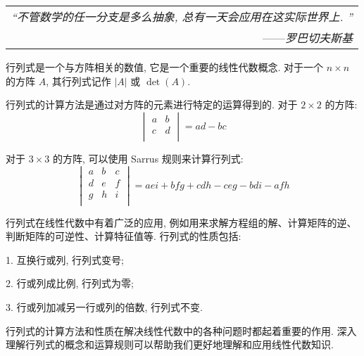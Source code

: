 \begin{flushright}
    \begin{tabular}{r||}
        \textit{“不管数学的任一分支是多么抽象, 总有一天会应用在这实际世界上. ”}\\
        ——\textit{罗巴切夫斯基}
    \end{tabular}
\end{flushright}

行列式是一个与方阵相关的数值, 它是一个重要的线性代数概念. 对于一个 $n \times n$ 的方阵 $A$, 其行列式记作 $|A|$ 或 $\det(A)$. 

行列式的计算方法是通过对方阵的元素进行特定的运算得到的. 对于 $2 \times 2$ 的方阵: 
$$
\begin{vmatrix}
a & b \\
c & d \\
\end{vmatrix} = ad - bc
$$

对于 $3 \times 3$ 的方阵, 可以使用 Sarrus 规则来计算行列式: 
$$
\begin{vmatrix}
a & b & c \\
d & e & f \\
g & h & i \\
\end{vmatrix} = aei + bfg + cdh - ceg - bdi - afh
$$

行列式在线性代数中有着广泛的应用, 例如用来求解方程组的解、计算矩阵的逆、判断矩阵的可逆性、计算特征值等. 行列式的性质包括: 

1. 互换行或列, 行列式变号;

2. 行或列成比例, 行列式为零;

3. 行或列加减另一行或列的倍数, 行列式不变. 

行列式的计算方法和性质在解决线性代数中的各种问题时都起着重要的作用. 深入理解行列式的概念和运算规则可以帮助我们更好地理解和应用线性代数知识. 
